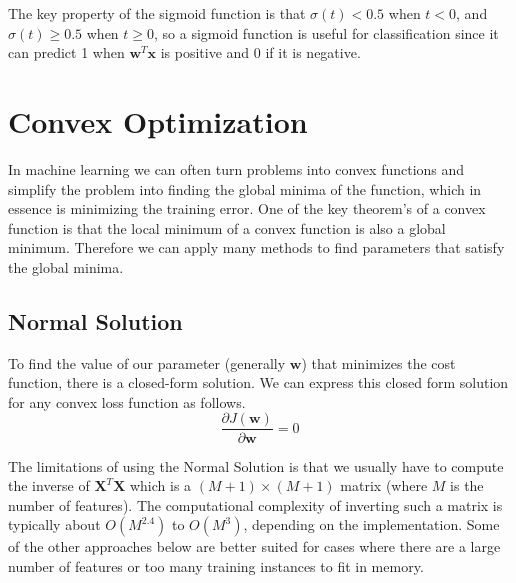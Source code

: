 \documentclass[12pt]{article}
\begin{document}

        The key property of the sigmoid function is that $\sigma(t) < 0.5$ when $t < 0$, and $\sigma(t) \geq 0.5$ when
        $t \geq 0$, so a sigmoid function is useful for classification since it can predict 1 when
        $\boldsymbol{w}^T\boldsymbol{x}$ is positive and 0 if it is negative.

\section{Convex Optimization} \label{sec:ConvexOptimization}
    In machine learning we can often turn problems into convex functions and simplify the problem into finding the
    global minima of the function, which in essence is minimizing the training error. One of the key theorem's of a
    convex function is that the local minimum of a convex function is also a global minimum. Therefore we can apply many
    methods to find parameters that satisfy the global minima.

    \subsection{Normal Solution} \label{sec:NormalSolution}
        To find the value of our parameter (generally $\boldsymbol{w}$) that minimizes the cost function, there is a
        closed-form solution. We can express this closed form solution for any convex loss function as follows.
        $$ \frac{\partial J(\boldsymbol{w})}{\partial \boldsymbol{w}} = 0 $$
        
        The limitations of using the Normal Solution is that we usually have to compute the inverse of
        $\boldsymbol{X}^T\boldsymbol{X}$ which is a $(M+1) \times (M+1)$ matrix (where $M$ is the number of features).
        The computational complexity of inverting such a matrix is typically about $O(M^{2.4})$ to $O(M^{3})$, depending
        on the implementation. Some of the other approaches below are better suited for cases where there are a large
        number of features or too many training instances to fit in memory.
\end{document}
